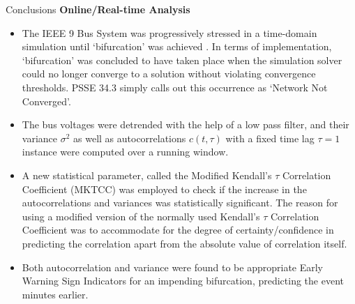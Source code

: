 \begin{frame}[allowframebreaks]{Conclusions}
	\noindent\textbf{Online/Real-time Analysis}
	\begin{itemize}
		\item The IEEE 9 Bus System was progressively stressed in a time-domain simulation until `bifurcation' was achieved \cite{sanchez01}. In terms of implementation, `bifurcation' was concluded to have taken place when the simulation solver could no longer converge to a solution without violating convergence thresholds. PSSE 34.3 simply calls out this occurrence as `Network Not Converged'.
		\item The bus voltages were detrended with the help of a low pass filter, and their variance $\sigma^2$ as well as autocorrelations $c(t, \tau)$ with a fixed time lag $\tau = 1$ instance were computed over a running window. 
		\item A new statistical parameter, called the Modified Kendall's $\tau$ Correlation Coefficient (MKTCC) was employed to check if the increase in the autocorrelations and variances was statistically significant. The reason for using a modified version of the normally used Kendall's $\tau$ Correlation Coefficient was to accommodate for the degree of certainty/confidence in predicting the correlation apart from the absolute value of correlation itself.
		\item Both autocorrelation and variance were found to be appropriate Early Warning Sign Indicators for an impending bifurcation, predicting the event minutes earlier. 
	\end{itemize}
\end{frame}




